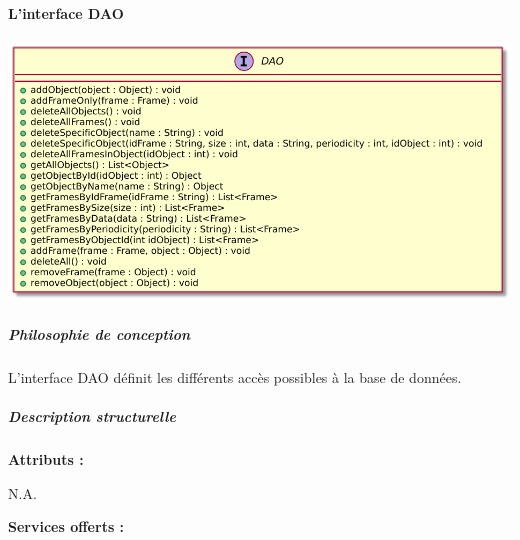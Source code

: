 \paragraph{L'interface DAO}

\begin{minipage}
    {\linewidth}
    \centering
    \includegraphics[width=0.80\linewidth]{../schemas/Conception_detaillee/interface_dao.pdf}
\end{minipage}

\subparagraph{Philosophie de conception \newline} 

\medspace

L'interface DAO définit les différents accès possibles à la base de données.

\subparagraph{Description structurelle \newline}

\medspace

\textbf{Attributs :}

N.A. 


\textbf{Services offerts :}

